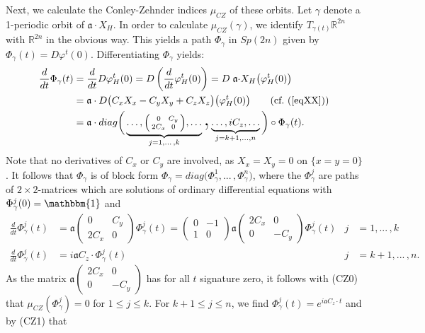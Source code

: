 \documentclass[a4paper,12pt,bibliography=totocnumbered,titlepage=false,abstracton,bookmarksnumbered=true]{scrartcl}
\theoremstyle{definition}
\begin{document}
Next, we calculate the Conley-Zehnder indices $\mu_{CZ}$ of these orbits. Let $\gamma$ denote a 1-periodic orbit of $\mathfrak{a}\cdot X_H$. In order to calculate $\mu_{CZ}(\gamma)$, we identify $T_{\gamma(t)}\mathbb{R}^{2n}$ with $\mathbb{R}^{2n}$ in the obvious way. This yields a path $\Phi_\gamma$ in $Sp(2n)$ given by $\Phi_\gamma(t)=D\varphi^t(0)$. Differentiating $\Phi_\gamma$ yields:
\begin{align*}
 \frac{d}{dt}\Phi_\gamma(t)&=\frac{d}{dt}D\varphi^t_H(0)=D\left(\frac{d}{dt}\varphi^t_H(0)\right)=D\; \mathfrak{a}{\cdot} X_H\big(\varphi^t_H(0)\big)\\
 &=\mathfrak{a}\cdot D\big(C_x X_x- C_y X_y+ C_z X_z\big)\big(\varphi^t_H(0)\big)\tag{cf.\ (\ref{eqXX})}\\
&=\mathfrak{a}\cdot diag\bigg(\underbrace{\dots,\Big(\begin{smallmatrix} 0 & C_y\\2C_x& 0\end{smallmatrix}\Big),\dots}_{j=1,...\,,k}\text{\Huge,}\underbrace{\dots, i C_z,\dots}_{j=k+1,...,n}\bigg)\circ\Phi_\gamma(t).
\end{align*}
Note that no derivatives of $C_x$ or $C_y$ are involved, as $X_x{=}X_y{=}0$ on $\{x{=}y{=}0\}$. It follows that $\Phi_\gamma$ is of block form $\Phi_\gamma = diag\big(\Phi^1_\gamma,...\,,\Phi_\gamma^n\big)$, where the $\Phi^j_\gamma$ are paths of $2{\times}2$-matrices which are solutions of ordinary differential equations with $\Phi^j_\gamma(0)=\mathbbm{1}$ and
\begin{align*}
 {\textstyle\frac{d}{dt}}\Phi^j_\gamma(t)&=\mathfrak{a}\begin{pmatrix}0 & C_y\\ 2C_x & 0\end{pmatrix}\Phi^j_\gamma(t) = \begin{pmatrix} 0 & -1\\ 1& 0\end{pmatrix}\mathfrak{a}\begin{pmatrix}  2C_x & 0\\0& -C_y\end{pmatrix}\Phi^j_\gamma(t)& j&=1,...\,,k\\
 {\textstyle\frac{d}{dt}}\Phi^j_\gamma(t)&=i\mathfrak{a} C_z\cdot\Phi^j_\gamma(t) & j&=k{+}1,...\,, n.
\end{align*}
As the matrix $\mathfrak{a}\left(\begin{smallmatrix}2C_x & 0\\ 0 & - C_y\end{smallmatrix}\right)$ has for all $t$ signature zero, it follows with (CZ0) that $\mu_{CZ}(\Phi^j_\gamma)=0$ for $1{\leq} j{\leq} k$. For $k{+}1{\leq} j{\leq} n$, we find $\Phi^j_\gamma(t)=e^{i\mathfrak{a} C_z\cdot t}$ and by (CZ1) that
\end{document}
